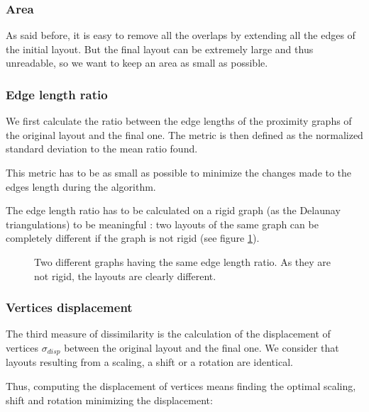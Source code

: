 \documentclass[12pt]{report}
\begin{document}
\subsubsection{Area}
As said before, it is easy to remove all the overlaps by extending all the edges of the initial layout. But the final layout can be extremely large and thus unreadable, so we want to keep an area as small as possible.

\subsubsection{Edge length ratio}
We first calculate the ratio between the edge lengths of the proximity graphs of the original layout and the final one. The metric is then defined as the normalized standard deviation to the mean ratio found.

This metric has to be as small as possible to minimize the changes made to the edges length during the algorithm.

The edge length ratio has to be calculated on a rigid graph (as the Delaunay triangulations) to be meaningful : two layouts of the same graph can be completely different if the graph is not rigid (see figure \ref{rigidGraph}).

\begin{figure}[h]
	\center
  \setlength\fboxsep{5pt}
  \setlength\fboxrule{0.5pt}
  \caption{Two different graphs having the same edge length ratio. As they are not rigid, the layouts are clearly different.}
  \label{rigidGraph}
\end{figure}

\subsubsection{Vertices displacement}

The third measure of dissimilarity is the calculation of the displacement of vertices $\sigma_{disp}$ between the original layout and the final one. We consider that layouts resulting from a scaling, a shift or a rotation are identical. 

Thus, computing the displacement of vertices means finding the optimal scaling, shift and rotation minimizing the displacement:
\end{document}
